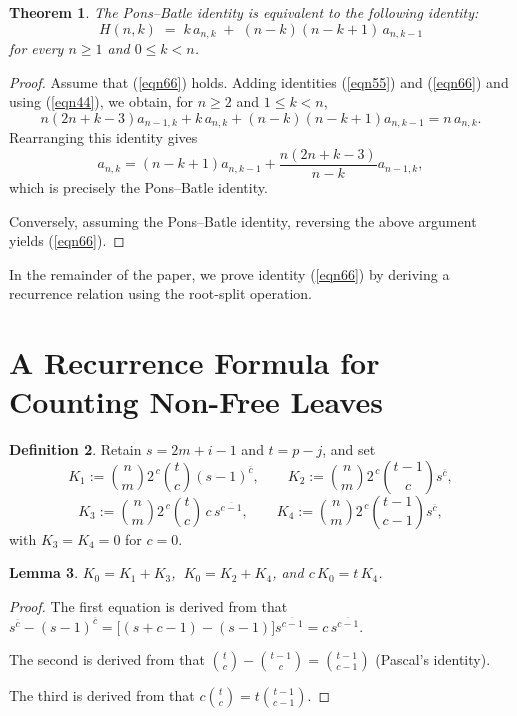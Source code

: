\documentclass[11pt]{article}
\newtheorem{theorem}{Theorem}[section]
\newtheorem{lemma}[theorem]{Lemma}
\theoremstyle{definition}
\newtheorem{definition}[theorem]{Definition}
\theoremstyle{remark}
\newcommand{\rise}[2]{#1^{\overline{#2}}}
\begin{document}
\begin{theorem}\label{thm:52}
The Pons--Batle identity is equivalent to the following identity:
\begin{equation}\label{eqn66}
  H(n,k)\;=\;k\,a_{n, k}\;+\;(n-k)(n-k+1)\,a_{n,k-1}
\end{equation}
for every $n\ge1$ and $0\le k<n$.
\end{theorem}
\begin{proof}
Assume that (\ref{eqn66}) holds. Adding identities (\ref{eqn55}) and (\ref{eqn66}) and using (\ref{eqn44}), we obtain, for $n\ge2$ and $1\le k<n$,
\[
n(2n+k-3)a_{n-1,k}
+k\,a_{n,k}
+(n-k)(n-k+1)a_{n,k-1}
=n\,a_{n,k}.
\]
Rearranging this identity gives
\[
a_{n,k}
=(n-k+1)a_{n,k-1}
+\frac{n(2n+k-3)}{n-k}a_{n-1,k},
\]
which is precisely the Pons--Batle identity.

Conversely, assuming the Pons--Batle identity, reversing the above argument yields (\ref{eqn66}).
\end{proof}

In the remainder of the paper, we prove identity (\ref{eqn66}) by deriving a recurrence relation using the root-split operation.


\section{A Recurrence Formula for Counting Non-Free Leaves}\label{sec:kernels}

\begin{definition}\label{def:fourkernels}
Retain $s=2m+i-1$ and $t=p-j$, and set
\[
  K_1:=\binom nm 2^{\,c}\binom tc\rise{(s-1)}{c},\qquad
  K_2:=\binom nm 2^{\,c}\binom{t-1}c\rise sc,
\]
\[
  K_3:=\binom nm 2^{\,c}\binom tc\,c\,\rise s{c-1},\qquad
  K_4:=\binom nm 2^{\,c}\binom{t-1}{c-1}\rise sc,
\]
with $K_3=K_4=0$ for $c=0$.
\end{definition}


\begin{lemma}\label{lem:kernelid}
$K_0=K_1+K_3$, $\ K_0=K_2+K_4$, and $c\,K_0=t\,K_4$.
\end{lemma}

\begin{proof}
The first equation is derived from that $\rise sc-\rise{(s-1)}c=\bigl[(s+c-1)-(s-1)\bigr]\rise s{c-1}=c\,\rise s{c-1}$.

The second is derived from that $\binom tc-\binom{t-1}c=\binom{t-1}{c-1}$ (Pascal's identity).

The third is derived from that  $c\binom tc=t\binom{t-1}{c-1}$.
\end{proof}
\end{document}

